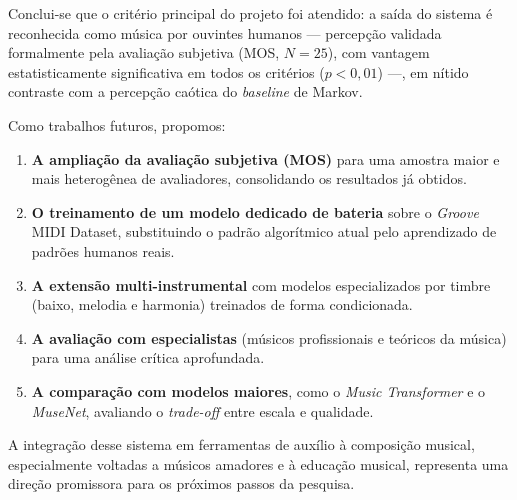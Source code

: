 \documentclass[12pt]{article}
\begin{document}
Conclui-se que o critério principal do projeto foi atendido: a saída do sistema é
reconhecida como música por ouvintes humanos --- percepção validada formalmente
pela avaliação subjetiva (MOS, $N = 25$), com vantagem estatisticamente
significativa em todos os critérios ($p < 0{,}01$) ---, em nítido contraste com a
percepção caótica do \emph{baseline} de Markov.

Como trabalhos futuros, propomos:

\begin{enumerate}
  \item \textbf{A ampliação da avaliação subjetiva (MOS)} para uma amostra maior e
    mais heterogênea de avaliadores, consolidando os resultados já obtidos.
  \item \textbf{O treinamento de um modelo dedicado de bateria} sobre o \emph{Groove}
    MIDI Dataset, substituindo o padrão algorítmico atual pelo aprendizado de
    padrões humanos reais.
  \item \textbf{A extensão multi-instrumental} com modelos especializados por
    timbre (baixo, melodia e harmonia) treinados de forma condicionada.
  \item \textbf{A avaliação com especialistas} (músicos profissionais e teóricos
    da música) para uma análise crítica aprofundada.
  \item \textbf{A comparação com modelos maiores}, como o \emph{Music Transformer}
    e o \emph{MuseNet}, avaliando o \emph{trade-off} entre escala e qualidade.
\end{enumerate}

A integração desse sistema em ferramentas de auxílio à composição musical,
especialmente voltadas a músicos amadores e à educação musical, representa uma
direção promissora para os próximos passos da pesquisa.

\nocite{yang2020}


\end{document}
